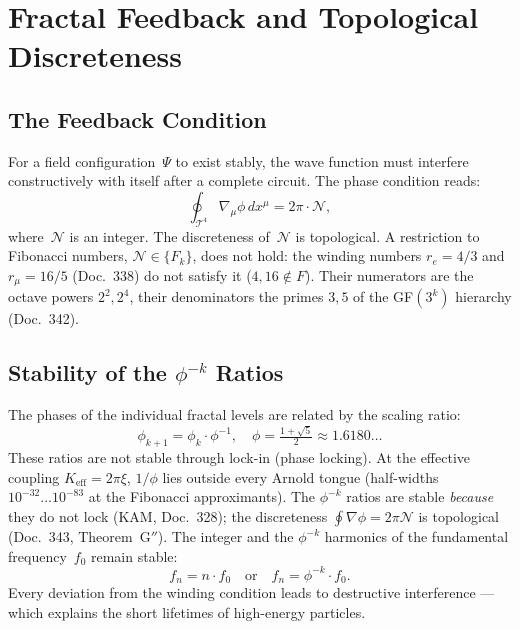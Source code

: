 \section{Fractal Feedback and Topological Discreteness}

\subsection{The Feedback Condition}

For a field configuration~$\Psi$ to exist stably, the wave function
must interfere constructively with itself after a complete circuit.
The phase condition reads:
\begin{equation}
  \oint_{\mathcal{T}^4} \nabla_{\mu}\phi\,dx^\mu = 2\pi\cdot\mathcal{N},
\end{equation}
where~$\mathcal{N}$ is an integer. The discreteness of~$\mathcal{N}$ is
topological. A restriction to Fibonacci numbers, $\mathcal{N} \in \{F_k\}$,
does not hold: the winding numbers $r_e = 4/3$ and $r_\mu = 16/5$
(Doc.~338) do not satisfy it ($4, 16 \notin F$). Their numerators are the
octave powers $2^2, 2^4$, their denominators the primes $3, 5$ of the
GF$(3^k)$ hierarchy (Doc.~342).

\subsection{Stability of the $\phi^{-k}$ Ratios}

The phases of the individual fractal levels are related by the scaling
ratio:
\begin{equation}
  \phi_{k+1} = \phi_k \cdot \phi^{-1}, \quad
  \phi = \tfrac{1+\sqrt{5}}{2} \approx 1.6180\ldots
\end{equation}
These ratios are not stable through lock-in (phase locking). At the
effective coupling $K_\mathrm{eff} = 2\pi\xi$, $1/\phi$ lies outside every
Arnold tongue (half-widths $10^{-32}\ldots10^{-83}$ at the Fibonacci
approximants). The $\phi^{-k}$ ratios are stable \emph{because} they do not
lock (KAM, Doc.~328); the discreteness $\oint\nabla\phi = 2\pi\mathcal{N}$
is topological (Doc.~343, Theorem~G$''$). The integer and the $\phi^{-k}$
harmonics of the fundamental frequency~$f_0$ remain stable:
\begin{equation}
  f_n = n \cdot f_0 \quad \text{or} \quad f_n = \phi^{-k}\cdot f_0.
\end{equation}
Every deviation from the winding condition leads to destructive
interference — which explains the short lifetimes of high-energy particles.

